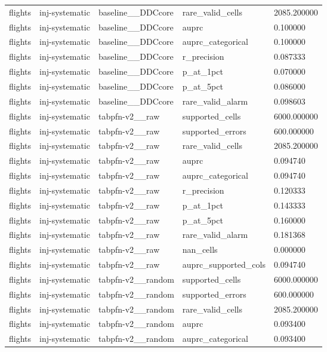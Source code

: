 \begin{tabular}{lllll}
flights & inj-systematic & baseline\_\_DDCcore & rare\_valid\_cells & 2085.200000 \\
flights & inj-systematic & baseline\_\_DDCcore & auprc & 0.100000 \\
flights & inj-systematic & baseline\_\_DDCcore & auprc\_categorical & 0.100000 \\
flights & inj-systematic & baseline\_\_DDCcore & r\_precision & 0.087333 \\
flights & inj-systematic & baseline\_\_DDCcore & p\_at\_1pct & 0.070000 \\
flights & inj-systematic & baseline\_\_DDCcore & p\_at\_5pct & 0.086000 \\
flights & inj-systematic & baseline\_\_DDCcore & rare\_valid\_alarm & 0.098603 \\
flights & inj-systematic & tabpfn-v2\_\_raw & supported\_cells & 6000.000000 \\
flights & inj-systematic & tabpfn-v2\_\_raw & supported\_errors & 600.000000 \\
flights & inj-systematic & tabpfn-v2\_\_raw & rare\_valid\_cells & 2085.200000 \\
flights & inj-systematic & tabpfn-v2\_\_raw & auprc & 0.094740 \\
flights & inj-systematic & tabpfn-v2\_\_raw & auprc\_categorical & 0.094740 \\
flights & inj-systematic & tabpfn-v2\_\_raw & r\_precision & 0.120333 \\
flights & inj-systematic & tabpfn-v2\_\_raw & p\_at\_1pct & 0.143333 \\
flights & inj-systematic & tabpfn-v2\_\_raw & p\_at\_5pct & 0.160000 \\
flights & inj-systematic & tabpfn-v2\_\_raw & rare\_valid\_alarm & 0.181368 \\
flights & inj-systematic & tabpfn-v2\_\_raw & nan\_cells & 0.000000 \\
flights & inj-systematic & tabpfn-v2\_\_raw & auprc\_supported\_cols & 0.094740 \\
flights & inj-systematic & tabpfn-v2\_\_random & supported\_cells & 6000.000000 \\
flights & inj-systematic & tabpfn-v2\_\_random & supported\_errors & 600.000000 \\
flights & inj-systematic & tabpfn-v2\_\_random & rare\_valid\_cells & 2085.200000 \\
flights & inj-systematic & tabpfn-v2\_\_random & auprc & 0.093400 \\
flights & inj-systematic & tabpfn-v2\_\_random & auprc\_categorical & 0.093400 \\

\end{tabular}
